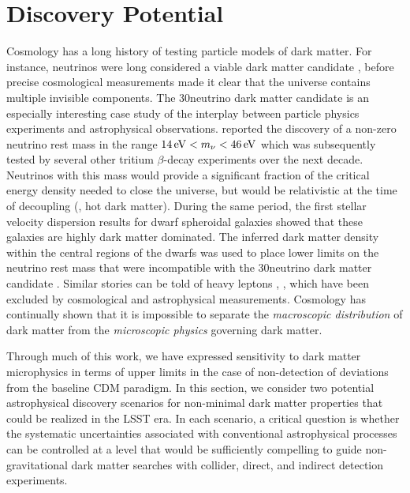 \chapter{Discovery Potential }
\label{sec:discovery}
\bigskip
{}

Cosmology has a long history of testing particle models of dark matter.
For instance, neutrinos were long considered a viable dark matter candidate \citep[\eg,][]{Kolb:1988}, before precise cosmological measurements made it clear that the universe contains multiple invisible components.
The 30\eV neutrino dark matter candidate is an especially interesting case study of the interplay between particle physics experiments and astrophysical observations.
\citet{Lyubimov:1980un} reported the discovery of a non-zero neutrino rest mass in the range $14\mathrm{\,eV} < m_{\nu} < 46\mathrm{\,eV}$ which was subsequently tested by several other tritium $\beta$-decay experiments over the next decade.
Neutrinos with this mass would provide a significant fraction of the critical energy density needed to close the universe, but would be relativistic at the time of decoupling (\ie, hot dark matter).
During the same period, the first stellar velocity dispersion results for dwarf spheroidal galaxies showed that these galaxies are highly dark matter dominated.
The inferred dark matter density within the central regions of the dwarfs was used to place lower limits on the neutrino rest mass that were incompatible with the 30\eV neutrino dark matter candidate \citep{Aaronson:1983,Gerhard:1992}.
Similar stories can be told of heavy leptons \citep[\eg,][]{Gunn:1978}, , which have been excluded by cosmological and astrophysical measurements.
Cosmology has continually shown that it is impossible to separate the \emph{macroscopic distribution} of dark matter from the \emph{microscopic physics} governing dark matter.

Through much of this work, we have expressed sensitivity to dark matter microphysics in terms of upper limits in the case of non-detection of deviations from the baseline CDM paradigm.
In this section, we consider two potential astrophysical discovery scenarios for non-minimal dark matter properties that could be realized in the LSST era.
In each scenario, a critical question is whether the systematic uncertainties associated with conventional astrophysical processes can be controlled at a level that would be sufficiently compelling to guide non-gravitational dark matter searches with collider, direct, and indirect detection experiments.


